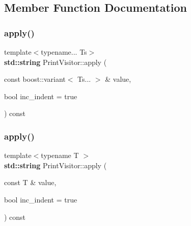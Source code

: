 \subsection{Member Function Documentation}
\mbox{\label{struct_print_visitor_aad3821f1c2546fed4bb51ae79067ddbb}} 
\subsubsection{\texorpdfstring{apply()}{apply()}\hspace{0.1cm}{\footnotesize\ttfamily [1/3]}}
{\footnotesize\ttfamily template$<$typename... Ts$>$ \\
\textbf{ std\+::string} Print\+Visitor\+::apply (\begin{DoxyParamCaption}\item[{const boost\+::variant$<$ Ts... $>$ \&}]{value,  }\item[{bool}]{inc\+\_\+indent = {\ttfamily true} }\end{DoxyParamCaption}) const\hspace{0.3cm}{\ttfamily [inline]}}

\mbox{\label{struct_print_visitor_ad6b9b3967b7355d3b62959cf29aef94e}} 
\subsubsection{\texorpdfstring{apply()}{apply()}\hspace{0.1cm}{\footnotesize\ttfamily [2/3]}}
{\footnotesize\ttfamily template$<$typename T $>$ \\
\textbf{ std\+::string} Print\+Visitor\+::apply (\begin{DoxyParamCaption}\item[{const T \&}]{value,  }\item[{bool}]{inc\+\_\+indent = {\ttfamily true} }\end{DoxyParamCaption}) const\hspace{0.3cm}{\ttfamily [inline]}}

\mbox{\label{struct_print_visitor_a6f3f12087aa58e605075e993876bfb89}} 
